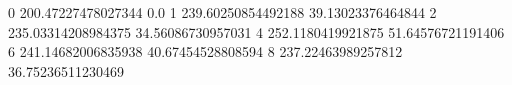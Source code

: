 0 200.47227478027344 0.0
1 239.60250854492188 39.13023376464844
2 235.03314208984375 34.56086730957031
4 252.1180419921875 51.64576721191406
6 241.14682006835938 40.67454528808594
8 237.22463989257812 36.75236511230469
